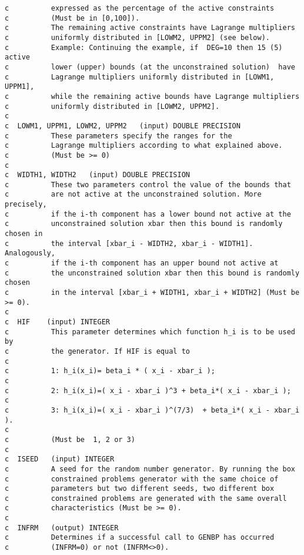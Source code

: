 \begin{verbatim}
c          expressed as the percentage of the active constraints 
c          (Must be in [0,100]).
c          The remaining active constraints have Lagrange multipliers 
c          uniformly distributed in [LOWM2, UPPM2] (see below). 
c          Example: Continuing the example, if  DEG=10 then 15 (5) active 
c          lower (upper) bounds (at the unconstrained solution)  have 
c          Lagrange multipliers uniformly distributed in [LOWM1, UPPM1], 
c          while the remaining active bounds have Lagrange multipliers 
c          uniformly distributed in [LOWM2, UPPM2]. 
c
c  LOWM1, UPPM1, LOWM2, UPPM2   (input) DOUBLE PRECISION
c          These parameters specify the ranges for the 
c          Lagrange multipliers according to what explained above.
c          (Must be >= 0)
c
c  WIDTH1, WIDTH2   (input) DOUBLE PRECISION
c          These two parameters control the value of the bounds that
c          are not active at the unconstrained solution. More precisely, 
c          if the i-th component has a lower bound not active at the 
c          unconstrained solution xbar then this bound is randomly chosen in 
c          the interval [xbar_i - WIDTH2, xbar_i - WIDTH1]. Analogously, 
c          if the i-th component has an upper bound not active at 
c          the unconstrained solution xbar then this bound is randomly chosen 
c          in the interval [xbar_i + WIDTH1, xbar_i + WIDTH2] (Must be >= 0).
c
c  HIF    (input) INTEGER
c          This parameter determines which function h_i is to be used by 
c          the generator. If HIF is equal to
c
c          1: h_i(x_i)= beta_i * ( x_i - xbar_i );
c
c          2: h_i(x_i)=( x_i - xbar_i )^3 + beta_i*( x_i - xbar_i );
c
c          3: h_i(x_i)=( x_i - xbar_i )^(7/3)  + beta_i*( x_i - xbar_i ).
c
c          (Must be  1, 2 or 3)
c
c  ISEED   (input) INTEGER
c          A seed for the random number generator. By running the box 
c          constrained problems generator with the same choice of
c          parameters but two different seeds, two different box 
c          constrained problems are generated with the same overall 
c          characteristics (Must be >= 0).
c
c  INFRM   (output) INTEGER
c          Determines if a successful call to GENBP has occurred 
c          (INFRM=0) or not (INFRM<>0).
\end{verbatim}

